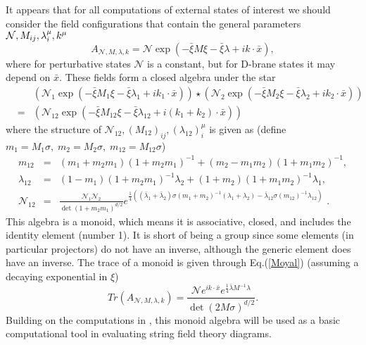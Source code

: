 \documentclass[a4paper,11pt]{article}
\begin{document}
It appears that for all computations of external states of interest we
should consider the field configurations that contain the general parameters
${\cal N},M_{ij},\lambda _{i}^{\mu },k^{\mu }$%
\begin{equation}
A_{\mathcal{N},M,\lambda ,k}=\mathcal{N}\exp \left( -\bar{\xi}M\xi -\bar{\xi}%
\lambda +ik\cdot \bar{x}\right) ,  \label{external}
\end{equation}%
where for perturbative states $\mathcal{N}$ is a constant, but for D-brane
states it may depend on $\bar{x}$. These fields form a closed algebra under
the star%
\begin{eqnarray}
&&\left( \mathcal{N}_{1}\exp \left( -\bar{\xi}M_1\xi -\bar{\xi}\lambda_1
+ik_{1}\cdot \bar{x}\right) \right) \star \left( \mathcal{N}_{2}\exp \left( -%
\bar{\xi}M_{2}\xi -\bar{\xi}\lambda _{2}+ik_{2}\cdot \bar{x}\right) \right)
\\
&=&\left( \mathcal{N}_{12}\exp \left( -\bar{\xi}M_{12}\xi -\bar{\xi}\lambda
_{12}+i\left( k_{1}+k_{2}\right) \cdot \bar{x}\right) \right)   \label{mono12}
\end{eqnarray}%
where the structure of $\mathcal{N}_{12},\left( M_{12}\right) _{ij},\left(
\lambda _{12}\right) _{i}^{\mu }$ is given as (define $m_{1}=M_{1}\sigma
,\;m_{2}=M_{2}\sigma ,\;m_{12}=M_{12}\sigma $)
\begin{eqnarray}
m_{12} &=&\left( m_{1}+m_{2}m_{1}\right) \left( 1+m_{2}m_{1}\right)
^{-1}+\left( m_{2}-m_{1}m_{2}\right) \left( 1+m_{1}m_{2}\right) ^{-1},
\label{m12} \\
\lambda _{12} &=&\left( 1-m_{1}\right) \left( 1+m_{2}m_{1}\right)
^{-1}\lambda _{2}+\left( 1+m_{2}\right) \left( 1+m_{1}m_{2}\right)
^{-1}\lambda _{1},  \label{lambda12} \\
\mathcal{N}_{12} &=&\frac{\mathcal{N}_{1}\mathcal{N}_{2}}{\det \left(
1+m_{2}m_{1}\right) ^{d/2}}e^{\frac{1}{4}\left( \left( \bar{\lambda}_{1}+%
\bar{\lambda}_{2}\right) \sigma \left( m_{1}+m_{2}\right) ^{-1}\left(
\lambda _{1}+\lambda _{2}\right) -\bar{\lambda}_{12}\sigma \left(
m_{12}\right) ^{-1}\lambda _{12}\right) }\,\,.  \label{n12}
\end{eqnarray}%
This algebra is a monoid, which means it is associative, closed, and
includes the identity element (number 1). It is short of being a group since
some elements (in particular projectors) do not have an inverse, although
the generic element does have an inverse. The trace of a monoid is given
through Eq.(\ref{Moyal}) (assuming a decaying exponential in $\xi $)%
\begin{equation}
Tr\left( A_{\mathcal{N},M,\lambda ,k}\right) =\frac{\mathcal{N}e^{ik\cdot
\bar{x}}e^{\frac{1}{4}\bar{\lambda}M^{-1}\lambda }}{\det \left( 2M\sigma
\right) ^{d/2}}.  \label{trace}
\end{equation}%
Building on the computations in \cite{BM2}, this monoid algebra will be used
as a basic computational tool in evaluating string field theory diagrams.
\end{document}
